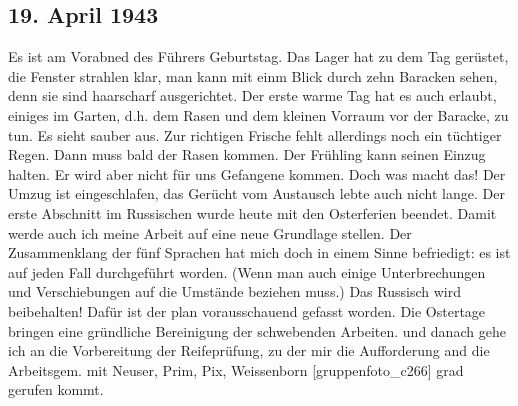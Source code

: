 \subsection{19. April 1943}

Es ist am Vorabned des F\"{u}hrers Geburtstag.
Das Lager hat zu dem Tag ger\"{u}stet, die Fenster strahlen klar, man kann mit einm Blick durch zehn Baracken sehen, denn sie sind haarscharf ausgerichtet.
Der erste warme Tag hat es auch erlaubt, einiges im Garten, d.h. dem Rasen und dem kleinen Vorraum vor der Baracke, zu tun.
Es sieht sauber aus.
Zur richtigen Frische fehlt allerdings noch ein t\"{u}chtiger Regen.
Dann  muss bald der Rasen kommen.
Der Fr\"{u}hling kann seinen Einzug halten.
Er wird aber nicht f\"{u}r uns Gefangene kommen.
Doch was macht das!
Der Umzug ist eingeschlafen, das Ger\"{u}cht vom Austausch lebte auch nicht lange.
Der erste Abschnitt im Russischen wurde heute mit den Osterferien beendet.
Damit werde auch ich meine Arbeit auf eine neue Grundlage stellen.
Der Zusammenklang der f\"{u}nf Sprachen hat mich doch in einem Sinne befriedigt: es ist auf jeden Fall durchgef\"{u}hrt worden.
(Wenn man auch einige Unterbrechungen und Verschiebungen auf die Umst\"{a}nde beziehen muss.)
Das Russisch wird beibehalten!
Daf\"{u}r ist der plan vorausschauend gefasst worden.
Die Ostertage bringen eine gr\"{u}ndliche Bereinigung der schwebenden Arbeiten.
und danach gehe ich an die Vorbereitung der Reifepr\"{u}fung, zu der mir die Aufforderung and die Arbeitsgem. mit Neuser, Prim, Pix, Weissenborn {\color{red} [gruppenfoto{\_}c266] } grad gerufen kommt.


\clearpage

